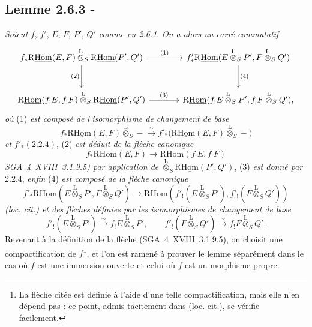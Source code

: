 \subsection*{Lemme 2.6.3 -}
\emph{Soient} $f$, $f'$, $E$, $F$, $P'$, $Q'$ \emph{comme en 2.6.1}. \emph{On a alors un carré commutatif}
\[
\begin{tikzcd}[column sep=large,row sep=large]
f_*\mathrm{R}\underline{\mathrm{Hom}}(E,F)\overset{\mathrm{L}}{\otimes}_S\mathrm{R}\underline{\mathrm{Hom}}(P',Q') \arrow[r,"(1)"] \arrow[d,"(2)"'] & f'_*\mathrm{R}\underline{\mathrm{Hom}}(E\overset{\mathrm{L}}{\otimes}_SP',F\overset{\mathrm{L}}{\otimes}_SQ') \arrow[d,"(4)"]\\
\mathrm{R}\underline{\mathrm{Hom}}(f_!E,f_!F)\overset{\mathrm{L}}{\otimes}_S\mathrm{R}\underline{\mathrm{Hom}}(P',Q') \arrow[r,"(3)"] & \mathrm{R}\underline{\mathrm{Hom}}(f_!E\overset{\mathrm{L}}{\otimes}_SP',f_!F\overset{\mathrm{L}}{\otimes}_SQ'),
\end{tikzcd}
\]
\emph{où} (1) \emph{est composé de l'isomorphisme de changement de base}
\[
f_*\mathrm{R}\underline{\mathrm{Hom}}(E,F)\overset{\mathrm{L}}{\otimes}_S -\xrightarrow{\sim}f'_*\bigl(\mathrm{R}\underline{\mathrm{Hom}}(E,F)\overset{\mathrm{L}}{\otimes}_S-\bigr)
\]
\emph{et} $f'_*(2.2.4)$, (2) \emph{est déduit de la flèche canonique}
\[
f_*\mathrm{R}\underline{\mathrm{Hom}}(E,F)\longrightarrow\mathrm{R}\underline{\mathrm{Hom}}(f_!E,f_!F)
\]
\emph{SGA~4~XVIII~3.1.9.5) par application de} $\overset{\mathrm{L}}{\otimes}_S\mathrm{R}\underline{\mathrm{Hom}}(P',Q')$, (3) \emph{est donné par} 2.2.4, \emph{enfin} (4) \emph{est composé de la flèche canonique}
\[
f'_*\mathrm{R}\underline{\mathrm{Hom}}(E\overset{\mathrm{L}}{\otimes}_SP',F\overset{\mathrm{L}}{\otimes}_SQ')
\longrightarrow
\mathrm{R}\underline{\mathrm{Hom}}(f'_!(E\overset{\mathrm{L}}{\otimes}_SP'),f'_!(F\overset{\mathrm{L}}{\otimes}_SQ'))
\]
\emph{(loc. cit.) et des flèches définies par les isomorphismes de changement de base}
\[
f'_!(E\overset{\mathrm{L}}{\otimes}_SP')\xrightarrow{\sim}f_!E\overset{\mathrm{L}}{\otimes}_SP',
\qquad
f'_!(F\overset{\mathrm{L}}{\otimes}_SQ')\xrightarrow{\sim}f_!F\overset{\mathrm{L}}{\otimes}_SQ'.
\]
Revenant à la définition de la flèche (SGA~4~XVIII~3.1.9.5), on choisit une compactification de $f$\footnote{La flèche citée est définie à l'aide d'une telle compactification, mais elle n'en dépend pas : ce point, admis tacitement dans (loc. cit.), se vérifie facilement.}, et l'on est ramené à prouver le lemme séparément dans le cas où $f$ est une immersion ouverte et celui où $f$ est un morphisme propre.

